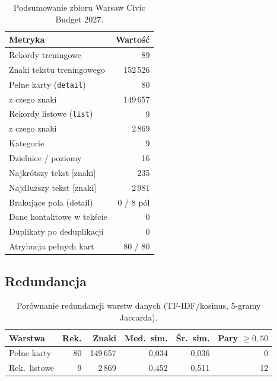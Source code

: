 \begin{table}[h]
  \centering
  \caption{Podsumowanie zbioru Warsaw Civic Budget 2027.}
  \label{tab:summary}
  \begin{tabular}{lr}
    \toprule
    Metryka                          & Wartość \\
    \midrule
    Rekordy treningowe               & 89 \\
    Znaki tekstu treningowego        & 152\,526 \\
    Pełne karty (\texttt{detail})    & 80 \\
    \quad z czego znaki              & 149\,657 \\
    Rekordy listowe (\texttt{list})  & 9 \\
    \quad z czego znaki              & 2\,869 \\
    Kategorie                        & 9 \\
    Dzielnice / poziomy              & 16 \\
    Najkrótszy tekst [znaki]         & 235 \\
    Najdłuższy tekst [znaki]         & 2\,981 \\
    Brakujące pola (detail)          & 0 / 8 pól \\
    Dane kontaktowe w tekście        & 0 \\
    Duplikaty po deduplikacji        & 0 \\
    Atrybucja pełnych kart           & 80 / 80 \\
    \bottomrule
  \end{tabular}
\end{table}

\subsection*{Redundancja}

\begin{table}[h]
  \centering
  \caption{Porównanie redundancji warstw danych (TF-IDF/kosinus,
  5-gramy Jaccarda).}
  \label{tab:redundancy}
  \begin{tabular}{lrrrrr}
    \toprule
    Warstwa & Rek. & Znaki & Med.\ sim. & Śr.\ sim.
            & Pary $\ge 0{,}50$ \\
    \midrule
    Pełne karty  & 80 & 149\,657 & 0{,}034 & 0{,}036 & 0 \\
    Rek.\ listowe &  9 &   2\,869 & 0{,}452 & 0{,}511 & 12 \\
    \bottomrule
  \end{tabular}
\end{table}

